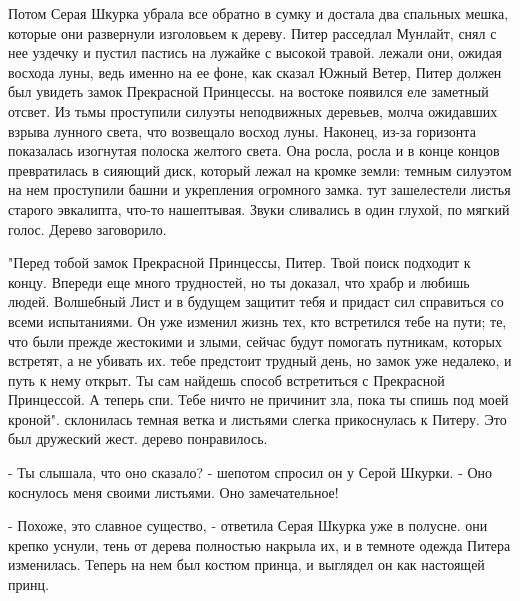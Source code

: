 Потом Серая Шкурка убрала все обратно в сумку и достала два спальных 
мешка, которые они развернули изголовьем к дереву. Питер расседлал 
Мунлайт, снял с нее уздечку и пустил пастись на лужайке с высокой 
травой.
 лежали они, ожидая восхода луны, ведь именно на ее фоне, как 
сказал Южный Ветер, Питер должен был увидеть замок Прекрасной 
Принцессы.
 на востоке появился еле заметный отсвет. Из тьмы проступили 
силуэты неподвижных деревьев, молча ожидавших взрыва лунного света, 
что возвещало восход луны. Наконец, из-за горизонта показалась 
изогнутая полоска желтого света. Она росла, росла и в конце концов 
превратилась в сияющий диск, который лежал на кромке земли: темным 
силуэтом на нем проступили башни и укрепления огромного замка.
 тут зашелестели листья старого эвкалипта, что-то нашептывая. 
Звуки сливались в один глухой, по мягкий голос. Дерево заговорило.
\par"Перед тобой замок Прекрасной Принцессы, Питер. Твой поиск 
подходит к концу. Впереди еще много трудностей, но ты доказал, что 
храбр и любишь людей. Волшебный Лист и в будущем защитит тебя и 
придаст сил справиться со всеми испытаниями. Он уже изменил жизнь тех, 
кто встретился тебе на пути; те, что были прежде жестокими и злыми, 
сейчас будут помогать путникам, которых встретят, а не убивать их.
 тебе предстоит трудный день, но замок уже недалеко, и путь 
к нему открыт. Ты сам найдешь способ встретиться с Прекрасной 
Принцессой. А теперь спи. Тебе ничто не причинит зла, пока ты спишь 
под моей кроной".
 склонилась темная ветка и листьями слегка прикоснулась к 
Питеру. Это был дружеский жест.
 дерево понравилось.
\par- Ты слышала, что оно сказало? - шепотом спросил он у Серой 
Шкурки. - Оно коснулось меня своими листьями. Оно замечательное!
\par- Похоже, это славное существо, - ответила Серая Шкурка уже в 
полусне.
 они крепко уснули, тень от дерева полностью накрыла их, и в 
темноте одежда Питера изменилась. Теперь на нем был костюм принца, и 
выглядел он как настоящей принц.
